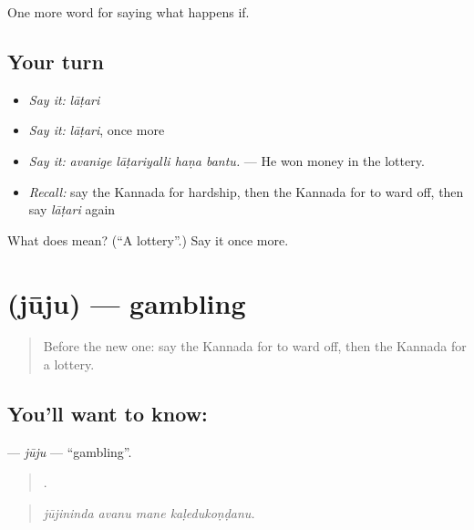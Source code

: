 \begin{grammarlens}[title={What you've built}]
One more word for saying what happens if.
\end{grammarlens}

\subsection*{Your turn}
\begin{itemize}
\raggedright
  \item \emph{Say it:} \emph{lāṭari}
  \item \emph{Say it:} \emph{lāṭari}, once more
  \item \emph{Say it:} \emph{avanige lāṭariyalli haṇa bantu.} — He won money in the lottery.
  \item \emph{Recall:} say the Kannada for hardship, then the Kannada for to ward off, then say \emph{lāṭari} again
\end{itemize}

\begin{tcolorbox}[breakable,colback=teal!4,colframe=teal!35!black,title={Before you move on}]
What does  mean? (\textquotedblleft{}A lottery\textquotedblright{}.) Say it once more.
\end{tcolorbox}
\section[\texorpdfstring{\kn{ಜೂಜು} (jūju)}{ಜೂಜು (jūju)}]{ (jūju) — gambling}

\label{lesson:KA-C413-juju}



\begin{quote}
Before the new one: say the Kannada for to ward off, then the Kannada for a lottery.
\end{quote}

\subsection*{You'll want to know: }
\textbf{} — \emph{jūju} — \textquotedblleft{}gambling\textquotedblright{}.

\begin{quote}
   .
\end{quote}

\begin{quote}
\emph{jūjininda avanu mane kaḷedukoṇḍanu.}
\end{quote}

